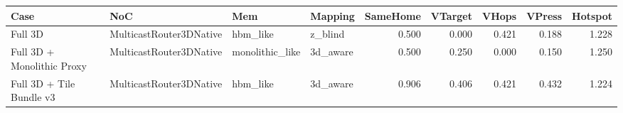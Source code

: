 \begin{tabular}{l l l l r r r r r}
\hline
Case & NoC & Mem & Mapping & SameHome & VTarget & VHops & VPress & Hotspot \\
\hline
Full 3D & MulticastRouter3DNative & hbm\_like & z\_blind & 0.500 & 0.000 & 0.421 & 0.188 & 1.228 \\
Full 3D + Monolithic Proxy & MulticastRouter3DNative & monolithic\_like & 3d\_aware & 0.500 & 0.250 & 0.000 & 0.150 & 1.250 \\
Full 3D + Tile Bundle v3 & MulticastRouter3DNative & hbm\_like & 3d\_aware & 0.906 & 0.406 & 0.421 & 0.432 & 1.224 \\
\hline
\end{tabular}
